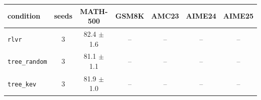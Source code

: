 \begin{tabular}{@{}lcccccc@{}}
\toprule
condition & seeds & MATH-500 & GSM8K & AMC23 & AIME24 & AIME25 \\ \midrule
\texttt{rlvr} & 3 & 82.4 $\pm$ 1.6 & -- & -- & -- & -- \\
\texttt{tree\_random} & 3 & 81.1 $\pm$ 1.1 & -- & -- & -- & -- \\
\texttt{tree\_kev} & 3 & 81.9 $\pm$ 1.0 & -- & -- & -- & -- \\
\bottomrule
\end{tabular}

